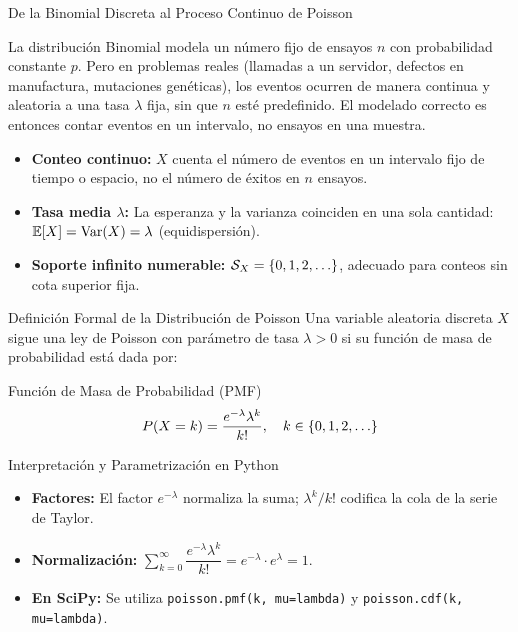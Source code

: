 \documentclass[10pt, aspectratio=169]{beamer}
\begin{document}
\begin{frame}{De la Binomial Discreta al Proceso Continuo de Poisson}
  \footnotesize
  \begin{motivacion}
    La distribución Binomial modela un número fijo de ensayos $n$ con probabilidad constante $p$. Pero en problemas reales (llamadas a un servidor, defectos en manufactura, mutaciones genéticas), los eventos ocurren de manera continua y aleatoria a una tasa $\lambda$ fija, sin que $n$ esté predefinido. El modelado correcto es entonces contar eventos en un intervalo, no ensayos en una muestra.
  \end{motivacion}

  \vspace{0.15cm}
  \pause
  \begin{itemize}\itemsep=0.1cm
    \item \textbf{Conteo continuo:} $X$ cuenta el número de eventos en un intervalo fijo de tiempo o espacio, no el número de éxitos en $n$ ensayos. \pause
    \item \textbf{Tasa media $\lambda$:} La esperanza y la varianza coinciden en una sola cantidad: $\mathbb{E}[X] = \operatorname{Var}(X) = \lambda$ (equidispersión). \pause
    \item \textbf{Soporte infinito numerable:} $\mathcal{S}_X = \set{0, 1, 2, \dots}$, adecuado para conteos sin cota superior fija.
  \end{itemize}
\end{frame}

\begin{frame}{Definición Formal de la Distribución de Poisson}
  \footnotesize
  Una variable aleatoria discreta $X$ sigue una ley de Poisson con parámetro de tasa $\lambda > 0$ si su función de masa de probabilidad está dada por: \pause

  \vspace{0.1cm}
  \begin{block}{Función de Masa de Probabilidad (PMF)}
    $$P(X = k) = \dfrac{e^{-\lambda} \lambda^{k}}{k!}, \quad k \in \set{0, 1, 2, \dots}$$
  \end{block}

  \vspace{0.1cm}
  \pause
  \begin{alertblock}{Interpretación y Parametrización en Python}
    \begin{itemize}\itemsep=0.06cm
      \item \textbf{Factores:} El factor $e^{-\lambda}$ normaliza la suma; $\lambda^{k}/k!$ codifica la cola de la serie de Taylor.
      \item \textbf{Normalización:} $\sum_{k=0}^{\infty} \dfrac{e^{-\lambda} \lambda^{k}}{k!} = e^{-\lambda} \cdot e^{\lambda} = 1$.
      \item \textbf{En SciPy:} Se utiliza \texttt{poisson.pmf(k, mu=lambda)} y \texttt{poisson.cdf(k, mu=lambda)}.
    \end{itemize}
  \end{alertblock}
\end{frame}
\end{document}
